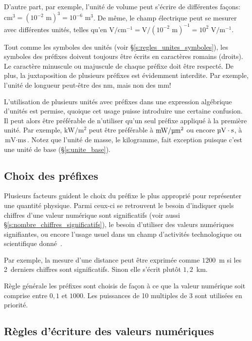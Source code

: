 D'autre part, par exemple, l'unité de volume peut s'écrire de différentes façons: $\text{cm}^3 = \left( 10^{-2} \text{~m} \right)^3 = 10^{-6} \text{~m}^3$. De même, le champ électrique peut se mesurer avec différentes unités, telles qu'en $\text{V} / \text{cm}^{-1} = \text{V} / \left( 10^{-2} \text{~m} \right)^{-1} = 10^{2} \text{~V} / \text{m}^{-1}$.

Tout comme les symboles des unités (voir \S\ref{s:regles_unites_symboles}), les symboles des préfixes doivent toujours être écrits en caractères romains (droits). Le caractère minuscule ou majuscule de chaque préfixe doit être respecté. De plus, la juxtaposition de plusieurs préfixes est évidemment interdite. Par exemple, l'unité de longueur peut-être des nm, mais non des m\textmu m!

L'utilisation de plusieurs unités avec préfixes dans une expression algébrique d'unités est permise, quoique cet usage puisse introduire une certaine confusion. Il peut alors être préférable de n'utiliser qu'un seul préfixe appliqué à la première unité. Par exemple, $\text{kW} / \text{m}^2$ peut être préférable à $\text{mW} / \text{\textmu m}^2$ ou encore $\text{\textmu V} \cdot \text{s}$, à $\text{mV} \cdot \text{ms}$. Notez que l'unité de masse, le kilogramme, fait exception puisque c'est une unité de base (\S\ref{s:unite_base}).


\subsection{Choix des préfixes}

Plusieurs facteurs guident le choix du préfixe le plus approprié pour représenter une quantité physique. Parmi ceux-ci se retrouvent le besoin d'indiquer quels chiffres d'une valeur numérique sont significatifs (voir aussi \S\ref{s:nombre_chiffres_significatifs}), le besoin d'utiliser des valeurs numériques signifiantes, ou encore l'usage usuel dans un champ d'activités technologique ou scientifique donné~\cite[\S7.9]{TAY95}.

Par exemple, la mesure d'une distance peut être exprimée comme $1200$~m si les 2~derniers chiffres sont significatifs. Sinon elle s'écrit plutôt $1,2$~km.

Règle générale les préfixes sont choisis de façon à ce que la valeur numérique soit comprise entre $0,1$ et $1000$. Les puissances de 10 multiples de 3 sont utilisées en priorité.


\subsection{Règles d'écriture des valeurs numériques}

